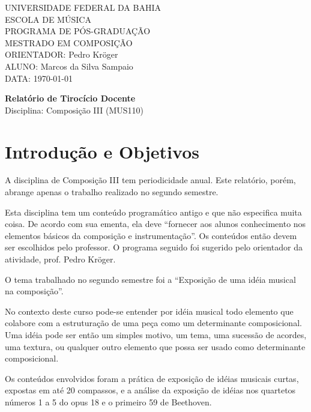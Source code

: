 \documentclass[12pt]{article}
\begin{document}
\setlength{\parindent}{0cm}
\setlength\parskip{1ex}

\large
UNIVERSIDADE FEDERAL DA BAHIA \\
ESCOLA DE MÚSICA \\
PROGRAMA DE PÓS-GRADUAÇÃO \\
MESTRADO EM COMPOSIÇÃO \\
ORIENTADOR: Pedro Kröger \\
ALUNO: Marcos da Silva Sampaio \\
DATA: \today

\thispagestyle{empty}
\vspace{1cm}
\begin{center}{
    \Huge \textbf{Relatório de Tirocício Docente} \\
}
\vspace{12pt}
{\Large Disciplina: Composição III (MUS110)}

\end{center}
\vspace{1cm}

\section{Introdução e Objetivos}
\label{sec:introducao}

A disciplina de Composição III tem periodicidade anual. Este
relatório, porém, abrange apenas o trabalho realizado no segundo
semestre.

Esta disciplina tem um conteúdo programático antigo e que não
especifica muita coisa. De acordo com sua ementa, ela deve ``fornecer
aos alunos conhecimento nos elementos básicos da composição e
instrumentação''. Os conteúdos então devem ser escolhidos pelo
professor. O programa seguido foi sugerido pelo orientador da
atividade, prof. Pedro Kröger.

O tema trabalhado no segundo semestre foi a ``Exposição de uma idéia
musical na composição''.

No contexto deste curso pode-se entender por idéia musical todo
elemento que colabore com a estruturação de uma peça como um
determinante composicional. Uma idéia pode ser então um simples
motivo, um tema, uma sucessão de acordes, uma textura, ou qualquer
outro elemento que possa ser usado como determinante composicional.

Os conteúdos envolvidos foram a prática de exposição de idéias
musicais curtas, expostas em até 20 compassos, e a análise da
exposição de idéias nos quartetos números 1 a 5 do opus 18 e o
primeiro 59 de Beethoven.
\end{document}
